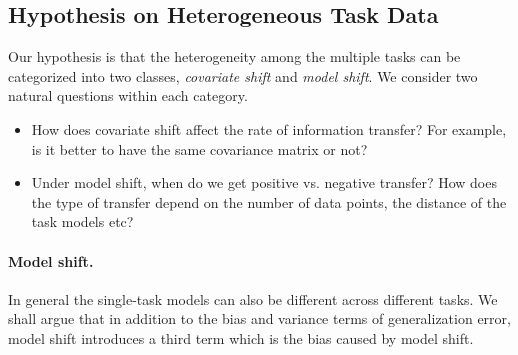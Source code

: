 

\subsection{Hypothesis on Heterogeneous Task Data}

Our hypothesis is that the heterogeneity among the multiple tasks can be categorized into two classes, \textit{covariate shift} and \textit{model shift}. %
We consider two natural questions within each category.
\begin{itemize}
	\item How does covariate shift affect the rate of information transfer?
	For example, is it better to have the same covariance matrix or not?
	\item Under model shift, when do we get positive vs. negative transfer?
	How does the type of transfer depend on the number of data points, the distance of the task models etc?
\end{itemize}


\paragraph{Model shift.}
In general the single-task models can also be different across different tasks.
We shall argue that in addition to the bias and variance terms of generalization error, model shift introduces a third term which is the bias caused by model shift.

